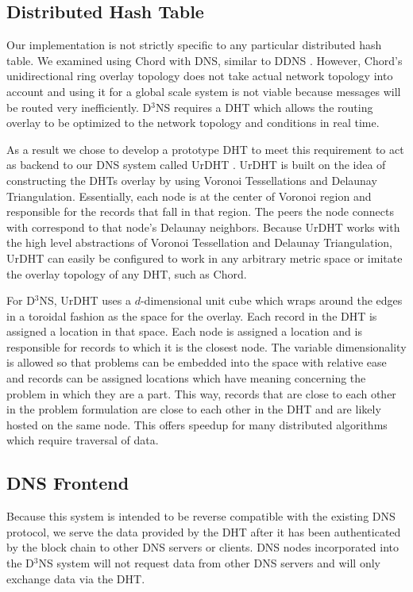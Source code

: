 \subsection{Distributed Hash Table}
Our implementation is not strictly specific to any particular distributed hash table.  We examined using Chord \cite{chord} with DNS, similar to DDNS \cite{cox2002serving}.  However, Chord's unidirectional ring overlay topology does not take actual network topology into account and using it for a global scale system is not viable because messages will be routed very inefficiently. D$^3$NS requires a DHT which allows the routing overlay to be optimized to the network topology and conditions in real time.


As a result we chose to develop a prototype DHT to meet this requirement to act as backend to our DNS system called UrDHT \cite{urdht}. 
UrDHT is built on the idea of constructing the DHTs overlay by using Voronoi Tessellations and Delaunay Triangulation. 
Essentially, each node is at the center of Voronoi region and responsible for the records that fall in that region.
The peers the node connects with correspond to that node's Delaunay neighbors. 
Because UrDHT works with the high level abstractions of Voronoi Tessellation and Delaunay Triangulation, UrDHT can  easily be configured to work in any arbitrary metric space or imitate the overlay topology of any DHT, such as Chord.

For D$^{3}$NS, UrDHT uses a $d$-dimensional unit cube which wraps around the edges in a toroidal fashion as the space for the overlay.
Each record in the DHT is assigned a location in that space. 
Each node is assigned a location and is responsible for records to which it is the closest node.
The variable dimensionality is allowed so that problems can be embedded into the space with relative ease and records can be assigned locations which have meaning concerning the problem in which they are a part. 
This way, records that are close to each other in the problem formulation are close to each other in the DHT and are likely hosted on the same node. 
This offers speedup for many distributed algorithms which require traversal of data.


\subsection{DNS Frontend}
Because this system is intended to be reverse compatible with the existing DNS protocol, we serve the data provided by the DHT after it has been authenticated by the block chain to other DNS servers or clients. DNS nodes incorporated into the D$^3$NS system will not request data from other DNS servers and will only exchange data via the DHT.


